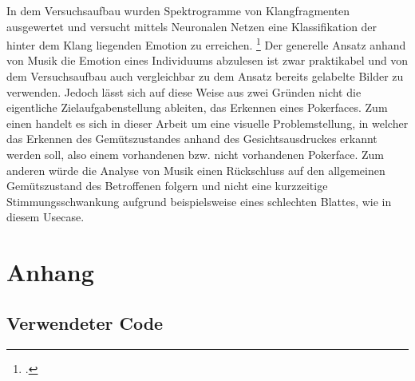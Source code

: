 \documentclass[12pt, a4paper]{report}
\begin{document}
In dem Versuchsaufbau wurden Spektrogramme von Klangfragmenten ausgewertet und versucht mittels Neuronalen Netzen eine Klassifikation der hinter dem Klang liegenden Emotion zu erreichen.
\footcite[Vgl. ][Abstract]{EmotionInSound}
Der generelle Ansatz anhand von Musik die Emotion eines Individuums abzulesen ist zwar praktikabel und von dem Versuchsaufbau auch vergleichbar zu dem Ansatz bereits gelabelte Bilder zu verwenden. Jedoch lässt sich auf diese Weise aus zwei Gründen nicht die eigentliche Zielaufgabenstellung ableiten, das Erkennen eines Pokerfaces. Zum einen handelt es sich in dieser Arbeit um eine visuelle Problemstellung, in welcher das Erkennen des Gemütszustandes anhand des Gesichtsausdruckes erkannt werden soll, also einem vorhandenen bzw. nicht vorhandenen Pokerface. Zum anderen würde die Analyse von Musik einen Rückschluss auf den allgemeinen Gemütszustand des Betroffenen folgern und nicht eine kurzzeitige Stimmungsschwankung aufgrund beispielsweise eines schlechten Blattes, wie in diesem Usecase.

\let\cleardoublepage\relax
\newpage

\printbibheading
\printbibliography[type=book,heading=subbibliography,title={Literaturquellen}]
\pagestyle{empty}
\printbibliography[type=misc,heading=subbibliography,title={Sonstige Quellen}]
\pagestyle{empty}
\newpage
\pagestyle{empty}

\chapter*{Anhang}
\section*{Verwendeter Code}
  
  
  \newpage
  
  \newpage
  
  \newpage
  
  \newpage
  
  \newpage
  
  \newpage
  
  \newpage
\end{document}
